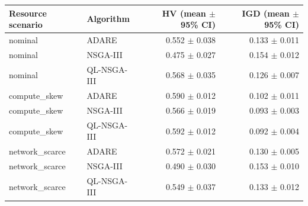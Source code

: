 \begin{tabular}{llrr}
\toprule
Resource scenario & Algorithm & HV (mean $\pm$ 95\% CI) & IGD (mean $\pm$ 95\% CI) \\
\midrule
nominal & ADARE & 0.552 $\pm$ 0.038 & 0.133 $\pm$ 0.011 \\
nominal & NSGA-III & 0.475 $\pm$ 0.027 & 0.154 $\pm$ 0.012 \\
nominal & QL-NSGA-III & 0.568 $\pm$ 0.035 & 0.126 $\pm$ 0.007 \\
compute\_skew & ADARE & 0.590 $\pm$ 0.012 & 0.102 $\pm$ 0.011 \\
compute\_skew & NSGA-III & 0.566 $\pm$ 0.019 & 0.093 $\pm$ 0.003 \\
compute\_skew & QL-NSGA-III & 0.592 $\pm$ 0.012 & 0.092 $\pm$ 0.004 \\
network\_scarce & ADARE & 0.572 $\pm$ 0.021 & 0.130 $\pm$ 0.005 \\
network\_scarce & NSGA-III & 0.490 $\pm$ 0.030 & 0.153 $\pm$ 0.010 \\
network\_scarce & QL-NSGA-III & 0.549 $\pm$ 0.037 & 0.133 $\pm$ 0.012 \\
\bottomrule
\end{tabular}
